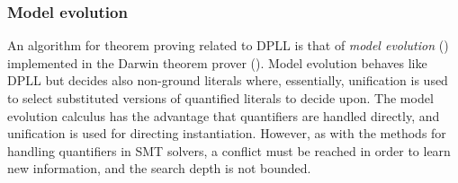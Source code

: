 \subsubsection*{Model evolution}
An algorithm for theorem proving related to DPLL is that of \textit{model evolution} (\cite{BaumgartnerPelzerTinelli12}) implemented in the Darwin theorem prover (\cite{Fuchs:Darwin:Thesis:2004}). Model evolution behaves like DPLL but decides also non-ground literals where, essentially, unification is used to select substituted versions of quantified literals to decide upon. The model evolution calculus has the advantage that quantifiers are handled directly, and unification is used for directing instantiation. 
However, as with the methods for handling quantifiers in SMT solvers, a conflict must be reached in order to learn new information, and the search depth is not bounded.



